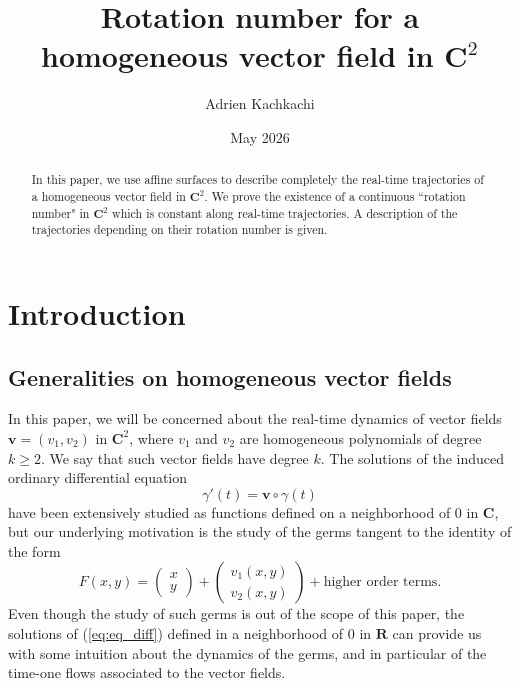 \documentclass[11pt]{article}
\title{Rotation number for a homogeneous vector field in $\mathbf{C}^{2}$}
\author{Adrien Kachkachi}
\date{May 2026}
\begin{document}
\maketitle

\begin{abstract}
    In this paper, we use affine surfaces to describe completely the real-time trajectories of a homogeneous vector field in $\mathbf{C}^{2}$. We prove the existence of a continuous ``rotation number" in $\mathbf{C}^{2}$ which is constant along real-time trajectories. A description of the trajectories depending on their rotation number is given.
\end{abstract}

\section{Introduction}

\label{sec:Intro}

\subsection{Generalities on homogeneous vector fields}

In this paper, we will be concerned about the real-time dynamics of vector fields $\mathbf{v}=\left(v_{1},v_{2}\right)$ in $\mathbf{C}^{2}$, where $v_{1}$ and $v_{2}$ are homogeneous polynomials of degree $k\geq2$. We say that such vector fields have degree $k$. The solutions of the induced ordinary differential equation
\begin{equation}
\label{eq:eq_diff}
    \gamma'(t)=\mathbf{v}\circ\gamma(t)
\end{equation}
have been extensively studied as functions defined on a neighborhood of 0 in $\mathbf{C}$, but our underlying motivation is the study of the germs tangent to the identity of the form $$F\left(x,y\right)=\left(
\begin{array}{c}
    x \\
    y
\end{array}
\right)+
\left(
\begin{array}{c}
    v_{1}\left(x,y\right) \\
    v_{2}\left(x,y\right)
\end{array}
\right)+\text{higher order terms}.$$ Even though the study of such germs is out of the scope of this paper, the solutions of (\ref{eq:eq_diff}) defined in a neighborhood of 0 in $\mathbf{R}$ can provide us with some intuition about the dynamics of the germs, and in particular of the time-one flows associated to the vector fields.
\end{document}
